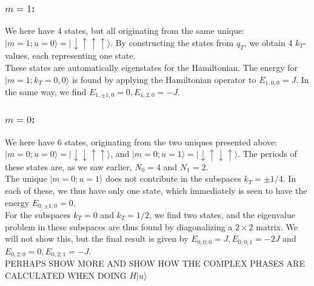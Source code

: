\documentclass{article}
\begin{document}
\subsubsection*{$m=1$:} 
We here have 4 states, but all originating from the same unique: $|m=1; u=0 \rangle = | \downarrow \uparrow \uparrow \uparrow \rangle$. By constructing the states from $q_T$, we obtain 4 $k_T$-values, each representing one state. \\

These states are automatically eigenstates for the Hamiltonian. The energy for $|m=1; k_T=0, 0 \rangle $ is found by applying the Hamiltonian operator to $E_{1,0,0} = J$.  In the same way, we find $E_{1,\pm 1,0} = 0, E_{1,2,0} = -J$.

\subsubsection*{$m=0$:}
We here have 6 states, originating from the two uniques presented above: 
$|m=0; u=0 \rangle = | \downarrow \downarrow \uparrow \uparrow \rangle$, and 
$|m=0; u=1 \rangle = | \downarrow \uparrow \downarrow \uparrow \rangle$. 
The periods of these states are, as we saw earlier, $N_0 = 4$ and $N_1 = 2$. \\

The unique $|m=0; u=1 \rangle$ does not contribute in the subspaces $k_T = \pm 1/4$. 
In each of these, we thus have only one state, which immediately is seen to have the energy $E_{0,\pm 1,0} = 0$.\\

For the subspaces $k_T = 0 $ and $k_T = 1/2 $, we find two states, and the eigenvalue problem in these subspaces are thus found by diagonalizing a $2 \times 2$ matrix. We will not show this, but the final result is given by
$E_{0,0;0} = J, E_{0,0;1} = -2J$ and $E_{0,2;0} = 0, E_{0,2;1} = -J$.\\

PERHAPS SHOW MORE AND SHOW HOW THE COMPLEX PHASES ARE CALCULATED WHEN DOING $H|u\rangle$
\end{document}
